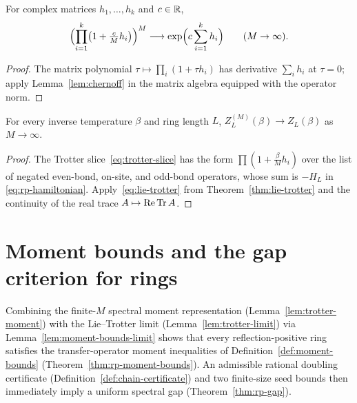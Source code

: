 \begin{theorem}
  \label{thm:lie-trotter}
  \leanok
  For complex matrices \(h_1, \dots, h_k\) and \(c \in \mathbb{R}\),
  \begin{equation}
    \label{eq:lie-trotter}
    \Bigl(\prod_{i=1}^k \bigl(1 + \tfrac{c}{M} h_i\bigr)\Bigr)^M \longrightarrow
    \exp\Bigl(c \sum_{i=1}^k h_i\Bigr) \qquad (M \to \infty).
  \end{equation}
\end{theorem}
\begin{proof}
  \leanok
  The matrix polynomial \(\tau \mapsto \prod_i (1 + \tau h_i)\) has derivative \(\sum_i h_i\) at
  \(\tau = 0\); apply Lemma~\ref{lem:chernoff} in the matrix algebra equipped with the operator
  norm.
\end{proof}

\begin{lemma}
  \label{lem:trotter-limit}
  \leanok
  For every inverse temperature \(\beta\) and ring length \(L\),
  \(Z^{(M)}_L(\beta) \to Z_L(\beta)\) as \(M \to \infty\).
\end{lemma}
\begin{proof}
  \leanok
  The Trotter slice~\eqref{eq:trotter-slice} has the form \(\prod (1 + \tfrac{\beta}{M} h_i)\) over
  the list of negated even-bond, on-site, and odd-bond operators, whose sum is \(-H_L\) in
  \eqref{eq:rp-hamiltonian}. Apply~\eqref{eq:lie-trotter} from Theorem~\ref{thm:lie-trotter} and the
  continuity of the real trace \(A \mapsto \operatorname{Re}\operatorname{Tr} A\).
\end{proof}

\section{Moment bounds and the gap criterion for rings}

Combining the finite-\(M\) spectral moment representation (Lemma~\ref{lem:trotter-moment}) with the
Lie--Trotter limit (Lemma~\ref{lem:trotter-limit}) via Lemma~\ref{lem:moment-bounds-limit} shows
that every reflection-positive ring satisfies the transfer-operator moment inequalities of
Definition~\ref{def:moment-bounds} (Theorem~\ref{thm:rp-moment-bounds}). An admissible rational
doubling certificate (Definition~\ref{def:chain-certificate}) and two finite-size seed bounds then
immediately imply a uniform spectral gap (Theorem~\ref{thm:rp-gap}).

